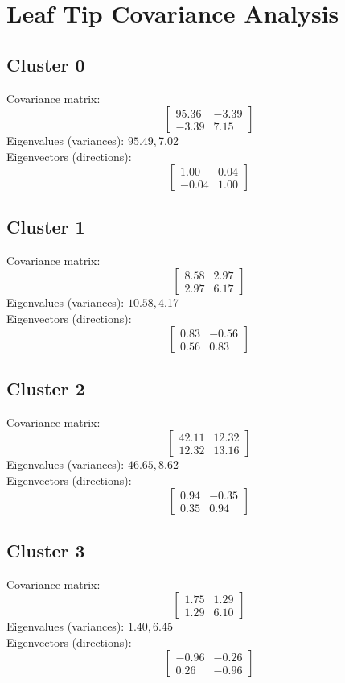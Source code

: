 \documentclass{article}
\begin{document}
\section*{Leaf Tip Covariance Analysis}
\subsection*{Cluster 0}
Covariance matrix:
\[\begin{bmatrix}95.36 & -3.39 \\-3.39 & 7.15\end{bmatrix}\]
Eigenvalues (variances): $ 95.49, $7.02\\
Eigenvectors (directions):
\[\begin{bmatrix}1.00 & 0.04 \\-0.04 & 1.00\end{bmatrix}\]
\subsection*{Cluster 1}
Covariance matrix:
\[\begin{bmatrix}8.58 & 2.97 \\2.97 & 6.17\end{bmatrix}\]
Eigenvalues (variances): $ 10.58, $4.17\\
Eigenvectors (directions):
\[\begin{bmatrix}0.83 & -0.56 \\0.56 & 0.83\end{bmatrix}\]
\subsection*{Cluster 2}
Covariance matrix:
\[\begin{bmatrix}42.11 & 12.32 \\12.32 & 13.16\end{bmatrix}\]
Eigenvalues (variances): $ 46.65, $8.62\\
Eigenvectors (directions):
\[\begin{bmatrix}0.94 & -0.35 \\0.35 & 0.94\end{bmatrix}\]
\subsection*{Cluster 3}
Covariance matrix:
\[\begin{bmatrix}1.75 & 1.29 \\1.29 & 6.10\end{bmatrix}\]
Eigenvalues (variances): $ 1.40, $6.45\\
Eigenvectors (directions):
\[\begin{bmatrix}-0.96 & -0.26 \\0.26 & -0.96\end{bmatrix}\]
\end{document}
